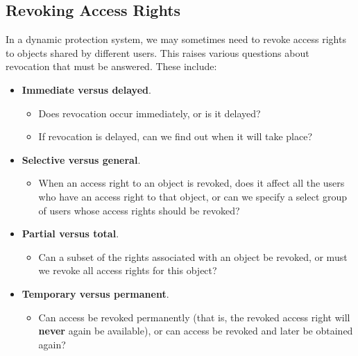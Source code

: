\subsection{Revoking Access Rights}\label{subsec:Revoking_Access_Rights}
In a dynamic protection system, we may sometimes need to revoke access rights to objects shared by different users.
This raises various questions about revocation that must be answered.
These include:
\begin{itemize}[noitemsep]
\item \textbf{Immediate versus delayed}.
  \begin{itemize}[noitemsep]
  \item Does revocation occur immediately, or is it delayed?
  \item If revocation is delayed, can we find out when it will take place?
  \end{itemize}
\item \textbf{Selective versus general}.
  \begin{itemize}[noitemsep]
  \item When an access right to an object is revoked, does it affect all the users who have an access right to that object, or can we specify a select group of users whose access rights should be revoked?
  \end{itemize}
\item \textbf{Partial versus total}.
  \begin{itemize}[noitemsep]
  \item Can a subset of the rights associated with an object be revoked, or must we revoke all access rights for this object?
  \end{itemize}
\item \textbf{Temporary versus permanent}.
  \begin{itemize}[noitemsep]
  \item Can access be revoked permanently (that is, the revoked access right will \textbf{never} again be available), or can access be revoked and later be obtained again?
  \end{itemize}
\end{itemize}


